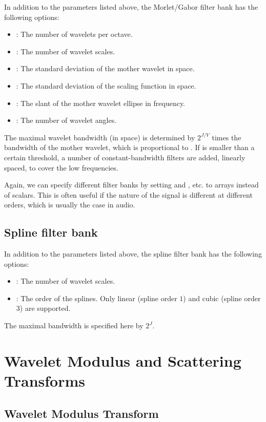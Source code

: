 \documentclass[twocolumn]{article}
\begin{document}
In addition to the parameters listed above, the Morlet/Gabor filter bank has the following options:
\begin{itemize}
	\item {}: The number of wavelets per octave.
	\item {}: The number of wavelet scales.
	\item {}: The standard deviation of the mother wavelet in space.
	\item {}: The standard deviation of the scaling function in space.
	\item {}: The slant of the mother wavelet ellipse in frequency.
	\item {}: The number of wavelet angles.
\end{itemize}
The maximal wavelet bandwidth (in space) is determined by $2^{J/V}$ times the bandwidth of the mother wavelet, which is proportional to . If  is smaller than a certain threshold, a number of constant-bandwidth filters are added, linearly spaced, to cover the low frequencies.

Again, we can specify different filter banks by setting  and , etc. to arrays instead of scalars. This is often useful if the nature of the signal is different at different orders, which is usually the case in audio.

\subsection{Spline filter bank}

In addition to the parameters listed above, the spline filter bank has the following options:
\begin{itemize}
	\item {}: The number of wavelet scales.
	\item {}: The order of the splines. Only linear (spline order $1$) and cubic (spline order $3$) are supported.
\end{itemize}
The maximal bandwidth is specified here by $2^J$.

\section{Wavelet Modulus and Scattering Transforms}

\subsection{Wavelet Modulus Transform}
\end{document}
